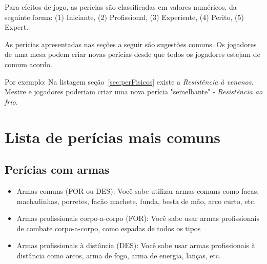Para efeitos de jogo, as perícias são classificadas em valores numéricos, da seguinte forma: (1) Iniciante, (2) Profissional, (3) Experiente, (4) Perito, (5) Expert.

As perícias apresentadas nas seções a seguir são sugestões comuns. Os jogadores de uma mesa podem criar novas perícias desde que todos os jogadores estejam de comum acordo.

Por exemplo: Na listagem seção~\ref{sec:perFisicos} existe a \emph{Resistência à venenos}. Mestre e jogadores poderiam criar uma nova perícia "semelhante" - \emph{Resistência ao frio}.
\section{\label{sec:pericias}Lista de perícias mais comuns}


\subsection{\label{sec:perArmas}Perícias com armas}
\begin{itemize}
	\item Armas comuns (FOR ou DES): Você sabe utilizar armas comuns como facas, machadinhas, porretes, facão machete, funda, besta de mão, arco curto, etc.
	\item Armas profissionais corpo-a-corpo (FOR): Você sabe usar armas profissionais de combate corpo-a-corpo, como espadas de todos os tipos 	
	\item Armas profissionais à distância (DES): Você sabe usar armas profissionais à distância como arcos, arma de fogo, arma de energia, lanças, etc.
\end{itemize}

